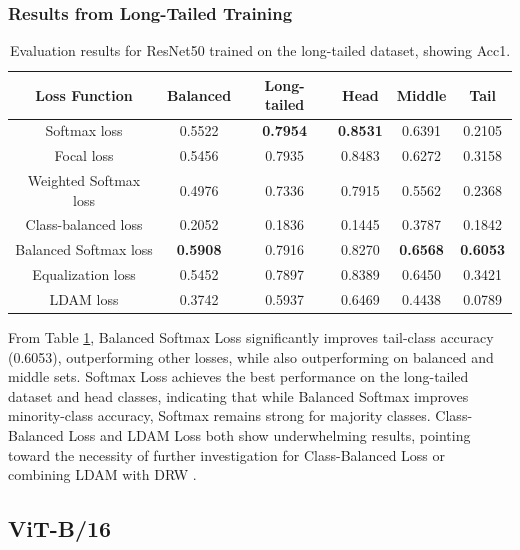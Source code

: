 \subsubsection{Results from Long-Tailed Training}

\begin{table}[H]
    \centering
    \caption{Evaluation results for ResNet50 trained on the long-tailed dataset, showing Acc1.}
    \begin{tabular}{cccccc}
        \toprule
        Loss Function & Balanced & Long-tailed & Head & Middle & Tail \\ 
        \midrule
        Softmax loss   & 0.5522 & \textbf{0.7954} & \textbf{0.8531} & 0.6391 & 0.2105 \\
        Focal loss   & 0.5456 & 0.7935 & 0.8483 & 0.6272 & 0.3158 \\
        Weighted Softmax loss   & 0.4976 & 0.7336 & 0.7915 & 0.5562 & 0.2368 \\
        Class-balanced loss   & 0.2052 & 0.1836 &  0.1445 & 0.3787 & 0.1842 \\
        Balanced Softmax loss   & \textbf{0.5908} & 0.7916 & 0.8270 & \textbf{0.6568} & \textbf{0.6053} \\
        Equalization loss   & 0.5452 & 0.7897 & 0.8389 & 0.6450 & 0.3421 \\
        LDAM loss   & 0.3742 & 0.5937 & 0.6469 & 0.4438 & 0.0789 \\
        \bottomrule
    \end{tabular}
    \label{tab:resnet_lt_acc1_1}
\end{table}

From Table \ref{tab:resnet_lt_acc1_1}, Balanced Softmax Loss significantly improves tail-class accuracy (0.6053), outperforming other losses, while also outperforming on balanced and middle sets. Softmax Loss achieves the best performance on the long-tailed dataset and head classes, indicating that while Balanced Softmax improves minority-class accuracy, Softmax remains strong for majority classes. Class-Balanced Loss and LDAM Loss both show underwhelming results, pointing toward the necessity of further investigation for Class-Balanced Loss  or combining LDAM with DRW \cite{cao2019learningimbalanceddatasetslabeldistributionaware}. 

\subsection{ViT-B/16}


